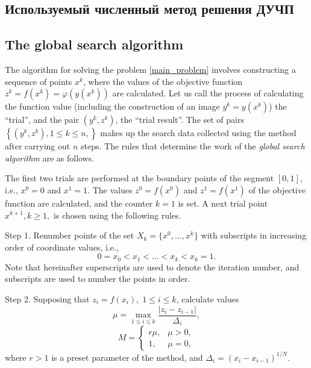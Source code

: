 \documentclass[sensors,article,submit,moreauthors,pdftex]{Definitions/mdpi}
\begin{document}
\subsection{Используемый численный метод решения ДУЧП}

\subsection{}

\subsection{The global search algorithm}\label{GSA}

The algorithm for solving the problem \ref{main_problem} involves constructing a sequence of points $x^k$, where the values of the objective function $z^k = f(x^k)=\varphi(y(x^k))$ are calculated. Let us call the process of calculating the function value (including the construction of an image $y^k=y(x^k)$) the ``trial'', and the pair $(y^k, z^k)$, the ``trial result''. The set of pairs $\left\{(y^k, z^k), 1\leq k\leq n,\right\}$ makes up the search data collected using the method after carrying out $n$ steps. The rules that determine the work of the \textit{global search algorithm} are as follows.

The first two trials are performed at the boundary points of the segment $[0,1]$, i.e., $x^0 = 0$ and $x^1 = 1$. The values $z^0 = f(x^0)$ and $z^1 = f(x^1)$ of the objective function are calculated, and the counter $k = 1$ is set. A next trial point $x^{k+1}, k \geq 1,$ is chosen using the following rules.

Step 1. Renumber points of the set $X_k=\{x^0,\dots,x^k\} $ with subscripts in increasing order of coordinate values, i.e.,
\[
0=x_0<x_1<\dots <x_k<x_{k}=1.
\]
Note that hereinafter superscripts are used to denote the iteration number, and subscripts are used to number the points in order.

Step 2. Supposing that  $z_i=f(x_i), \; 1\leq i \leq k$, calculate values 
\begin{equation}\label{mu}
\mu = \max_{1\leq i \leq k}\frac{\left|z_i-z_{i-1}\right|}{\Delta_i},
\end{equation}
\[
M = \left\{
   \begin{array}{lr}
     r\mu, & \mu > 0,\\
     1, & \mu = 0,
   \end{array}
\right.
 \]
where $r>1$ is a preset parameter of the method, and $\Delta_i=\left(x_i-x_{i-1}\right)^{1/N}$.
\end{document}

